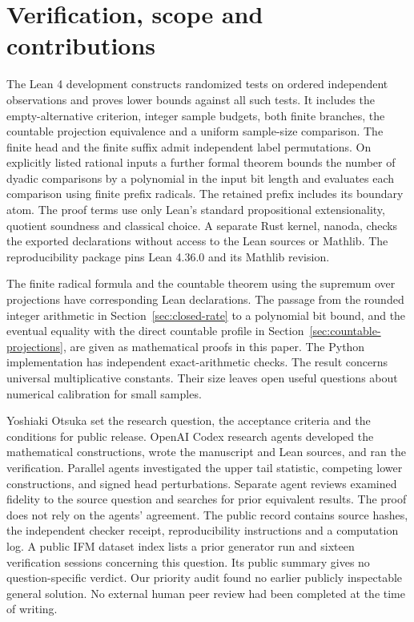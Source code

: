 \section{Verification, scope and contributions}
The Lean 4 development constructs randomized tests on ordered independent
observations and proves lower bounds against all such tests. It includes
the empty-alternative criterion, integer sample budgets, both finite
branches, the countable projection equivalence and a uniform sample-size
comparison. The finite head and the finite suffix admit independent label
permutations. On explicitly listed rational inputs a further formal theorem bounds the number of dyadic comparisons by a polynomial in the input bit length and evaluates each comparison using finite prefix radicals. The retained prefix includes its boundary atom. The proof
terms use only Lean's standard propositional extensionality, quotient
soundness and classical choice. A separate Rust kernel, nanoda, checks
the exported declarations without access to the Lean sources or Mathlib.
The reproducibility package pins Lean 4.36.0 and its Mathlib revision.

The finite radical formula and the countable theorem using the supremum
over projections have corresponding Lean declarations. The passage from
the rounded integer arithmetic in Section~\ref{sec:closed-rate} to a
polynomial bit bound, and the eventual equality with the direct countable
profile in Section~\ref{sec:countable-projections}, are given as mathematical
proofs in this paper. The Python implementation has independent exact-arithmetic
checks. The result concerns universal multiplicative constants. Their size
leaves open useful questions about numerical calibration for small samples.

Yoshiaki Otsuka set the research question, the acceptance criteria and
the conditions for public release. OpenAI Codex research agents developed
the mathematical constructions, wrote the manuscript and Lean sources,
and ran the verification. Parallel agents investigated the upper tail
statistic, competing lower constructions, and signed head perturbations.
Separate agent reviews examined fidelity to the source question and
searches for prior equivalent results. The proof does not rely on the
agents' agreement. The public record contains source hashes, the independent
checker receipt, reproducibility instructions and a computation log.
A public IFM dataset index lists a prior generator run and sixteen verification sessions concerning this question. Its public summary gives no question-specific verdict. Our priority audit found no earlier publicly inspectable general solution. No external human peer review had been completed at the time of writing.
